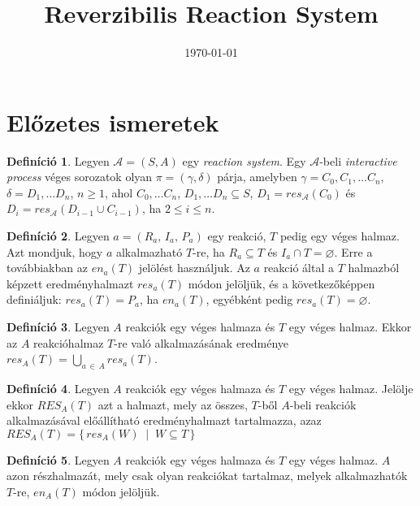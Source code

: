\documentclass[12pt]{article}
\title{Reverzibilis Reaction System}
\date{\today}
\theoremstyle{definition}
\newtheorem*{definition*}{Definíció}
\theoremstyle{remark}
\theoremstyle{plain}
\theoremstyle{plain}
\let\emptyset\varnothing
\newcommand{\en}{\textit{en}}
\newcommand{\res}{\textit{res}}
\newcommand{\reaction}[3]{
    (#1, \, #2, \, #3)
}
\begin{document}
    \maketitle

    \section*{Előzetes ismeretek}

    \begin{definition*}
        Legyen $\mathscr{A} = (S, A)$ egy \textit{reaction system}. Egy $\mathscr{A}$-beli \textit{interactive process} véges sorozatok olyan $\pi = (\gamma, \delta)$ párja, amelyben $\gamma = C_{0}, C_{1}, \ldots C_{n}$, $\delta = D_{1}, \ldots D_{n}$, $n \geq 1$, ahol $C_{0}, \ldots C_{n}$, $D_{1}, \ldots D_{n} \subseteq S$, $D_{1} = \textit{res}_{\mathscr{A}}(C_{0})$ és $D_{i} = \textit{res}_{\mathscr{A}}(D_{i - 1} \cup C_{i - 1})$, ha $2 \leq i \leq n$.
    \end{definition*}

    \begin{definition*}
        Legyen $a = \reaction{R_{a}}{I_{a}}{P_{a}}$ egy reakció, $T$ pedig egy véges halmaz. Azt mondjuk, hogy $a$ alkalmazható $T$-re, ha $R_{a} \subseteq T$ és $I_{a} \cap T = \emptyset$. Erre a továbbiakban az $\en_{a}(T)$ jelölést használjuk. Az $a$ reakció által a $T$ halmazból képzett eredményhalmazt $\res_{a}(T)$ módon jelöljük, és a következőképpen definiáljuk: $\res_{a}(T) = P_{a}$, ha $\en_{a}(T)$, egyébként pedig $\res_{a}(T) = \emptyset$.
    \end{definition*}

    \begin{definition*}
        Legyen $A$ reakciók egy véges halmaza és $T$ egy véges halmaz. Ekkor az $A$ reakcióhalmaz $T$-re való alkalmazásának eredménye $\res_{A}(T) = \bigcup_{a \,\in\, A}\res_{a}(T)$.
    \end{definition*}

    \begin{definition*}
        Legyen $A$ reakciók egy véges halmaza és $T$ egy véges halmaz. Jelölje ekkor $\textit{RES}_{A}(T)$ azt a halmazt, mely az összes, $T$-ből $A$-beli reakciók alkalmazásával előállítható eredményhalmazt tartalmazza, azaz $\textit{RES}_{A}(T) = \{ \, \res_{A}(W) \; \mid \; W \subseteq T\, \}$
    \end{definition*}

    \begin{definition*}
        Legyen $A$ reakciók egy véges halmaza és $T$ egy véges halmaz. $A$ azon részhalmazát, mely csak olyan reakciókat tartalmaz, melyek alkalmazhatók $T$-re, $\en_{A}(T)$ módon jelöljük.
    \end{definition*}
\end{document}
